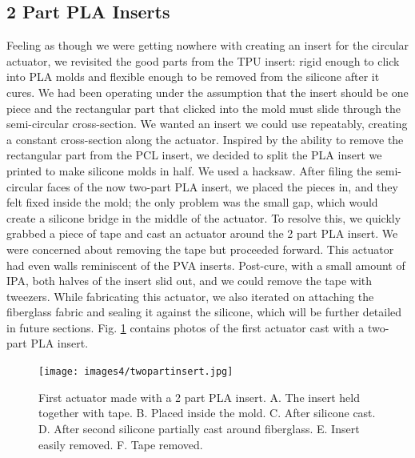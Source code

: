 \clearpage
\subsection{2 Part PLA Inserts}
Feeling as though we were getting nowhere with creating an insert for the circular actuator, we revisited the good parts from the TPU insert: rigid enough to click into PLA molds and flexible enough to be removed from the silicone after it cures. We had been operating under the assumption that the insert should be one piece and the rectangular part that clicked into the mold must slide through the semi-circular cross-section. We wanted an insert we could use repeatably, creating a constant cross-section along the actuator. Inspired by the ability to remove the rectangular part from the PCL insert, we decided to split the PLA insert we printed to make silicone molds in half. We used a hacksaw. After filing the semi-circular faces of the now two-part PLA insert, we placed the pieces in, and they felt fixed inside the mold; the only problem was the small gap, which would create a silicone bridge in the middle of the actuator. To resolve this, we quickly grabbed a piece of tape and cast an actuator around the 2 part PLA insert. We were concerned about removing the tape but proceeded forward. This actuator had even walls reminiscent of the PVA inserts. Post-cure, with a small amount of IPA, both halves of the insert slid out, and we could remove the tape with tweezers. While fabricating this actuator, we also iterated on attaching the fiberglass fabric and sealing it against the silicone, which will be further detailed in future sections. Fig. \ref{fig:twopartinsert} contains photos of the first actuator cast with a two-part PLA insert. 

\begin{figure}[ht]
    \centering
    \texttt{[image: images4/twopartinsert.jpg]}
    \caption{First actuator made with a 2 part PLA insert. A. The insert held together with tape. B. Placed inside the mold. C. After silicone cast. D. After second silicone partially cast around fiberglass. E. Insert easily removed. F. Tape removed.}
    \label{fig:twopartinsert}
\end{figure}

